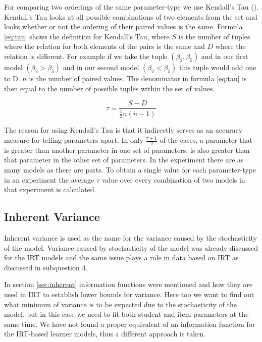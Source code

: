 \documentclass{scrartcl}
\begin{document}
For comparing two orderings of the same parameter-type we use Kendall's Tau (\cite{rank}). Kendall's Tau looks at all possible combinations of two elements from the set and looks whether or not the ordering of their paired values is the same. Formula \ref{eq:tau} shows the definition for Kendall's Tau, where $S$ is the number of tuples where the relation for both elements of the pairs is the same and $D$ where the relation is different. For example if we take the tuple $(\beta_{2},\beta_{5})$ and in our first model $(\beta_{2}>\beta_{5})$ and in our second model $(\beta_{2}<\beta_{5})$ this tuple would add one to D. $n$ is the number of paired values. The denominator in formula \ref{eq:tau} is then equal to the number of possible tuples within the set of values.
  
\begin{equation}
\label{eq:tau}
\tau=\frac{S-D}{\frac{1}{2} n (n-1)}
\end{equation}

The reason for using Kendall's Tau is that it indirectly serves as an accuracy measure for telling parameters apart. In only $\frac{\tau+1}{2}$ of the cases, a parameter that is greater than another parameter in one set of parameters, is also greater than that parameter in the other set of parameters. In the experiment there are as many models as there are parts. To obtain a single value for each parameter-type in an experiment the average $\tau$ value over every combination of two models in that experiment is calculated.

\subsection{Inherent Variance}
Inherent variance is used as the name for the variance caused by the stochasticity of the model. Variance caused by stochasticity of the model was already discussed for the IRT models and the same issue plays a role in data based on IRT as discussed in subquestion 4.

In section \ref{sec:inherent} information functions were mentioned and how they are used in IRT to establish lower bounds for variance. Here too we want to find out what minimum of variance is to be expected due to the stochasticity of the model, but in this case we need to fit both student and item parameters at the same time. We have not found a proper equivalent of an information function for the IRT-based learner models, thus a different approach is taken.
\end{document}
